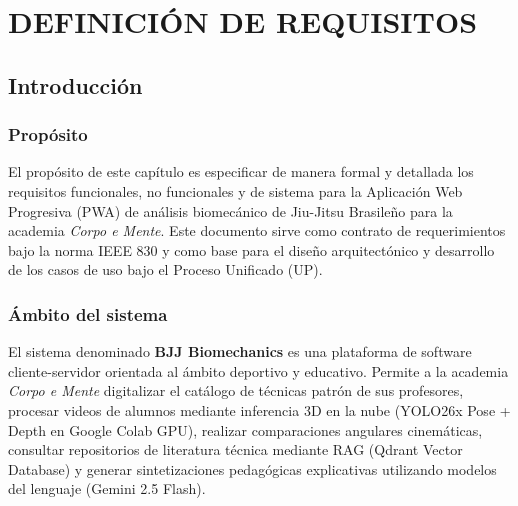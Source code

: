 \chapter{DEFINICIÓN DE REQUISITOS}

\section{Introducción}

\subsection{Propósito}
El propósito de este capítulo es especificar de manera formal y detallada los requisitos funcionales, no funcionales y de sistema para la Aplicación Web Progresiva (PWA) de análisis biomecánico de Jiu-Jitsu Brasileño para la academia \textit{Corpo e Mente}. Este documento sirve como contrato de requerimientos bajo la norma IEEE 830 y como base para el diseño arquitectónico y desarrollo de los casos de uso bajo el Proceso Unificado (UP).

\subsection{Ámbito del sistema}
El sistema denominado \textbf{BJJ Biomechanics} es una plataforma de software cliente-servidor orientada al ámbito deportivo y educativo. Permite a la academia \textit{Corpo e Mente} digitalizar el catálogo de técnicas patrón de sus profesores, procesar videos de alumnos mediante inferencia 3D en la nube (YOLO26x Pose + Depth en Google Colab GPU), realizar comparaciones angulares cinemáticas, consultar repositorios de literatura técnica mediante RAG (Qdrant Vector Database) y generar sintetizaciones pedagógicas explicativas utilizando modelos del lenguaje (Gemini 2.5 Flash).

